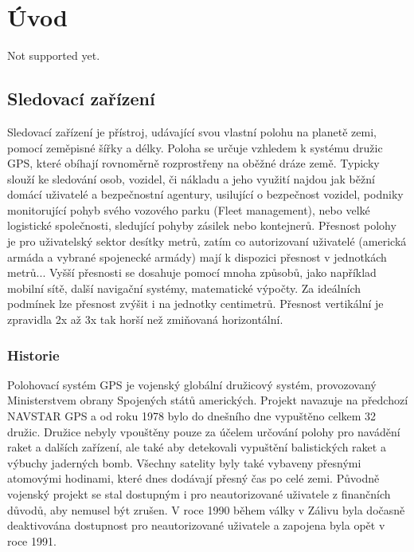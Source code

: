 \documentclass[FM,BP]{tulthesis}
\begin{document}
\chapter{Úvod}
Not supported yet.

\section{Sledovací zařízení}
Sledovací zařízení je přístroj, udávající svou vlastní polohu na planetě zemi, pomocí zeměpisné šířky a délky. Poloha se určuje vzhledem k systému družic GPS, které obíhají rovnoměrně rozprostřeny na oběžné dráze země. Typicky slouží ke sledování osob, vozidel, či nákladu a jeho využití najdou jak běžní domácí uživatelé a bezpečnostní agentury, usilující o bezpečnost vozidel, podniky monitorující pohyb svého vozového parku (Fleet management), nebo velké logistické společnosti, sledující pohyby zásilek nebo kontejnerů. Přesnost polohy je pro uživatelský sektor desítky metrů, zatím co autorizovaní uživatelé (americká armáda a vybrané spojenecké armády) mají k dispozici přesnost v jednotkách metrů... Vyšší přesnosti se dosahuje pomocí mnoha způsobů, jako například mobilní sítě, další navigační systémy, matematické výpočty. Za ideálních podmínek lze přesnost zvýšit i na jednotky centimetrů. Přesnost vertikální je zpravidla 2x až 3x tak horší než zmiňovaná horizontální.

\subsection{Historie}
Polohovací systém GPS je vojenský globální družicový systém, provozovaný Ministerstvem obrany Spojených států amerických. Projekt navazuje na předchozí NAVSTAR GPS a od roku 1978 bylo do dnešního dne vypuštěno celkem 32 družic. Družice nebyly vpouštěny pouze za účelem určování polohy pro navádění raket a dalších zařízení, ale také aby detekovali vypuštění balistických raket a výbuchy jaderných bomb. Všechny satelity byly také vybaveny přesnými atomovými hodinami, které dnes dodávají přesný čas po celé zemi. Původně vojenský projekt se stal dostupným i pro neautorizované uživatele z finančních důvodů, aby nemusel být zrušen. V roce 1990 během války v Zálivu byla dočasně deaktivována dostupnost pro neautorizované uživatele a zapojena byla opět v roce 1991.
\end{document}
